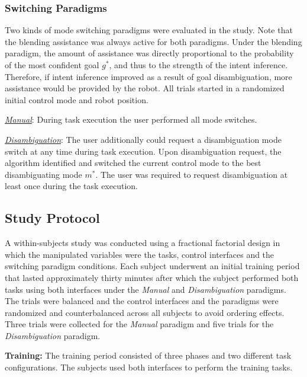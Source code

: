 \documentclass[natbib, twocolumn]{svjour3}          %
\begin{document}
\subsubsection{Switching Paradigms}
Two kinds of mode switching paradigms were evaluated in the study. Note that the blending assistance was always active for both paradigms. Under the blending paradigm, the amount of assistance was directly proportional to the probability of the most confident goal $g^*$, and thus to the strength of the intent inference. Therefore, if intent inference improved as a result of goal disambiguation, more assistance would be provided by the robot. All trials started in a randomized initial control mode and robot position. 

\noindent\underline{\textit{Manual}}: During task execution the user performed all mode switches. 

\noindent\underline{\textit{Disambiguation}}: The user additionally could request a disambiguation mode switch at any time during task execution. Upon disambiguation request, the algorithm identified and switched the current control mode to the best disambiguating mode $m^*$. The user was required to request disambiguation at least once during the task execution.  



\subsection{Study Protocol}
 

A within-subjects study was conducted using a fractional factorial design in which the manipulated variables were the tasks, control interfaces and the switching paradigm conditions. Each subject underwent an initial training period that lasted approximately thirty minutes after which the subject performed both tasks using both interfaces under the \textit{Manual} and \textit{Disambiguation} paradigms. The trials were balanced and the control interfaces and the paradigms were randomized and counterbalanced across all subjects to avoid ordering effects. Three trials were collected for the \textit{Manual} paradigm and five trials for the \textit{Disambiguation} paradigm. 

\noindent\textbf{Training:} The training period consisted of three phases and two different task configurations. The subjects used both interfaces to perform the training tasks.
\end{document}

